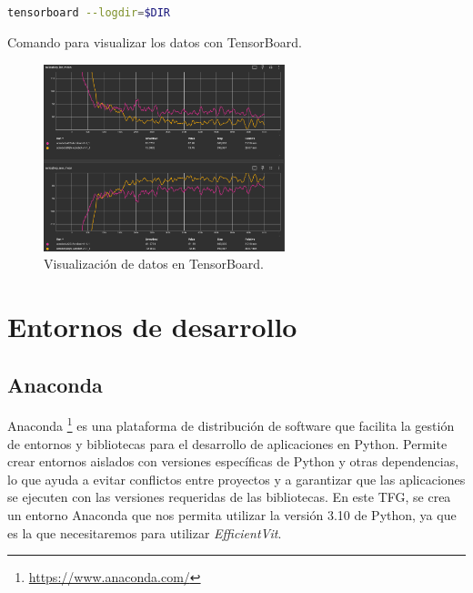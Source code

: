 \begin{code}[h]
\begin{lstlisting}[language=bash]

tensorboard --logdir=$DIR

\end{lstlisting}
\caption[Comando para visualizar los datos en TensorBoard]{Comando para visualizar los datos con TensorBoard.}
\label{cod:cmdtsb}
\end{code}

\begin{figure}[ht]
  \begin{center}
    \includegraphics[width=7cm]{figs/Plataformas_Desarollo/TensorBoard.png}
  \end{center}
  \caption{Visualización de datos en TensorBoard.}
  \label{tensorboard}
\end{figure}

\section{Entornos de desarrollo}
\label{sec:des}

\subsection{Anaconda}
\label{sec:conda}

Anaconda \footnote{\url{https://www.anaconda.com/}} es una plataforma de distribución de software que facilita la gestión de entornos y bibliotecas para el desarrollo de aplicaciones en Python. Permite crear entornos aislados con versiones específicas de Python y otras dependencias, lo que ayuda a evitar conflictos entre proyectos y a garantizar que las aplicaciones se ejecuten con las versiones requeridas de las bibliotecas. En este \ac{TFG}, se crea un entorno Anaconda que nos permita utilizar la versión 3.10 de Python, ya que es la que necesitaremos para utilizar \textit{EfficientVit}.

